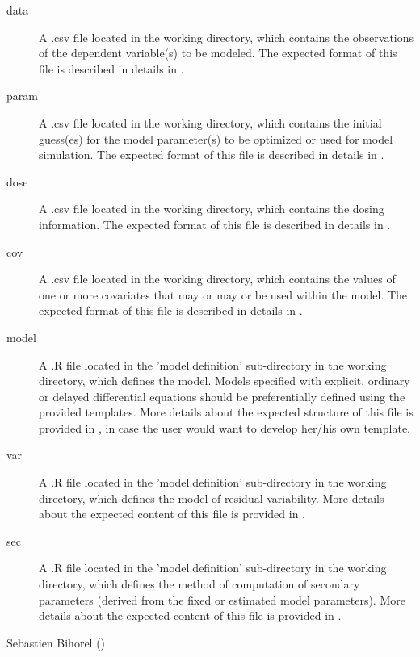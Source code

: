 \begin{Arguments}
\begin{ldescription}
\begin{description}
\item[data] A .csv file located in the working directory, which contains
the observations of the dependent variable(s) to be modeled. The
expected format of this file is described in details in
.
\item[param] A .csv file located in the working directory, which contains
the initial guess(es) for the model parameter(s) to be optimized or used
for model simulation. The expected format of this file is described in
details in .
\item[dose] A .csv file located in the working directory, which contains
the dosing information. The expected format of this file is described in
details in .
\item[cov] A .csv file located in the working directory, which contains
the values of one or more covariates that may or may or be used within
the model. The expected format of this file is described in details in
.
\item[model] A .R file located in the 'model.definition'
sub-directory in the working directory, which defines the model. Models
specified with explicit, ordinary or delayed differential equations
should be preferentially defined using the provided templates. More
details about the expected structure of this file is provided in
, in case the user would
want to develop her/his own template.
\item[var] A .R file located in the 'model.definition' sub-directory
in the working directory, which defines the model of residual
variability. More details about the expected content of this file is
provided in .
\item[sec] A .R file located in the 'model.definition' sub-directory
in the working directory, which defines the method of computation of
secondary parameters (derived from the fixed or estimated model
parameters). More details about the expected content of this file is
provided in .

\end{description}


\end{ldescription}
\end{Arguments}
%
\begin{Author}\relax
Sebastien Bihorel ()
\end{Author}

